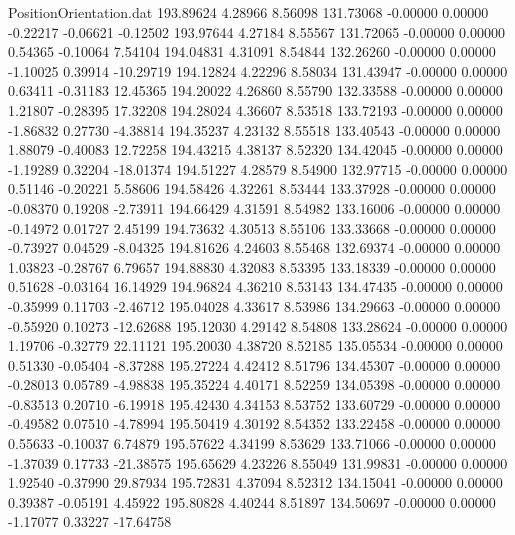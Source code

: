 \begin{filecontents}{PositionOrientation.dat}
 193.89624    4.28966    8.56098   131.73068   -0.00000    0.00000   -0.22217   -0.06621   -0.12502
 193.97644    4.27184    8.55567   131.72065   -0.00000    0.00000    0.54365   -0.10064    7.54104
 194.04831    4.31091    8.54844   132.26260   -0.00000    0.00000   -1.10025    0.39914  -10.29719
 194.12824    4.22296    8.58034   131.43947   -0.00000    0.00000    0.63411   -0.31183   12.45365
 194.20022    4.26860    8.55790   132.33588   -0.00000    0.00000    1.21807   -0.28395   17.32208
 194.28024    4.36607    8.53518   133.72193   -0.00000    0.00000   -1.86832    0.27730   -4.38814
 194.35237    4.23132    8.55518   133.40543   -0.00000    0.00000    1.88079   -0.40083   12.72258
 194.43215    4.38137    8.52320   134.42045   -0.00000    0.00000   -1.19289    0.32204  -18.01374
 194.51227    4.28579    8.54900   132.97715   -0.00000    0.00000    0.51146   -0.20221    5.58606
 194.58426    4.32261    8.53444   133.37928   -0.00000    0.00000   -0.08370    0.19208   -2.73911
 194.66429    4.31591    8.54982   133.16006   -0.00000    0.00000   -0.14972    0.01727    2.45199
 194.73632    4.30513    8.55106   133.33668   -0.00000    0.00000   -0.73927    0.04529   -8.04325
 194.81626    4.24603    8.55468   132.69374   -0.00000    0.00000    1.03823   -0.28767    6.79657
 194.88830    4.32083    8.53395   133.18339   -0.00000    0.00000    0.51628   -0.03164   16.14929
 194.96824    4.36210    8.53143   134.47435   -0.00000    0.00000   -0.35999    0.11703   -2.46712
 195.04028    4.33617    8.53986   134.29663   -0.00000    0.00000   -0.55920    0.10273  -12.62688
 195.12030    4.29142    8.54808   133.28624   -0.00000    0.00000    1.19706   -0.32779   22.11121
 195.20030    4.38720    8.52185   135.05534   -0.00000    0.00000    0.51330   -0.05404   -8.37288
 195.27224    4.42412    8.51796   134.45307   -0.00000    0.00000   -0.28013    0.05789   -4.98838
 195.35224    4.40171    8.52259   134.05398   -0.00000    0.00000   -0.83513    0.20710   -6.19918
 195.42430    4.34153    8.53752   133.60729   -0.00000    0.00000   -0.49582    0.07510   -4.78994
 195.50419    4.30192    8.54352   133.22458   -0.00000    0.00000    0.55633   -0.10037    6.74879
 195.57622    4.34199    8.53629   133.71066   -0.00000    0.00000   -1.37039    0.17733  -21.38575
 195.65629    4.23226    8.55049   131.99831   -0.00000    0.00000    1.92540   -0.37990   29.87934
 195.72831    4.37094    8.52312   134.15041   -0.00000    0.00000    0.39387   -0.05191    4.45922
 195.80828    4.40244    8.51897   134.50697   -0.00000    0.00000   -1.17077    0.33227  -17.64758

\end{filecontents}
